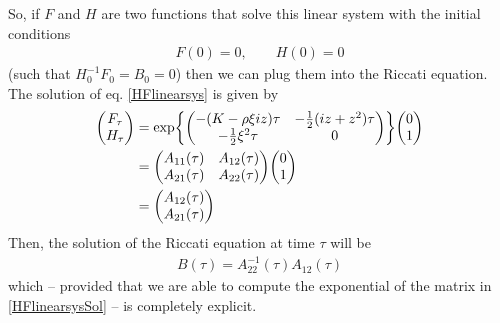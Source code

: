 So, if $F$ and $H$ are two functions that solve this linear system with the initial conditions
\begin{align}
    F(0) = 0, \qquad H(0) = 0
\end{align}
(such that $H_0^{-1}F_0=B_0=0$) then we can plug them into the Riccati equation. The solution of eq. \eqref{HFlinearsys} is given by
\begin{align}\label{HFlinearsysSol}
    \notag \mqty(F_{\tau} \\ H_{\tau}) &= \exp{\mqty(-(K-\rho\xi iz)\tau & - \frac{1}{2}(iz+z^2)\tau \\ -\tfrac{1}{2}\xi^2\tau & 0)}\mqty(0\\1) \\
    &=
    \mqty(A_{11}(\tau) & A_{12}(\tau) \\ A_{21}(\tau) & A_{22}(\tau))\mqty(0\\1) \\
    &=
    \mqty(A_{12}(\tau) \\ A_{21}(\tau))
\end{align}
Then, the solution of the Riccati equation at time $\tau$ will be
\begin{eqnarray}
    B(\tau) = A_{22}^{-1}(\tau) A_{12}(\tau)
\end{eqnarray}
which -- provided that we are able to compute the exponential of the matrix in \eqref{HFlinearsysSol} -- is completely explicit. %
